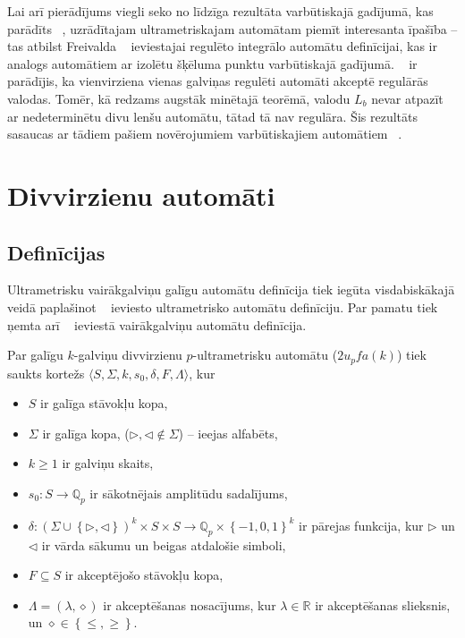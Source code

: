 \documentclass{ludis}
\begin{document}

Lai arī pierādījums viegli seko no līdzīga rezultāta varbūtiskajā gadījumā, kas parādīts ~\citep{Freivalds1979}, uzrādītajam ultrametriskajam automātam piemīt interesanta īpašība -- tas atbilst Freivalda ~\citep{Freivalds2012} ieviestajai regulēto integrālo automātu definīcijai, kas ir analogs automātiem ar izolētu šķēluma punktu varbūtiskajā gadījumā. ~\citet{KasparsBalodis2013} ir parādījis, ka vienvirziena vienas galviņas regulēti automāti akceptē regulārās valodas. Tomēr, kā redzams augstāk minētajā teorēmā, valodu $L_b$ nevar atpazīt ar nedeterminētu divu lenšu automātu, tātad tā nav regulāra. Šis rezultāts sasaucas ar tādiem pašiem novērojumiem varbūtiskajiem automātiem ~\citep{Freivalds1981,Freivalds1979}.

\chapter{Divvirzienu automāti}
\section{Definīcijas}
Ultrametrisku vairākgalviņu galīgu automātu definīcija tiek iegūta visdabiskākajā veidā paplašinot ~\citep{KasparsBalodis2013} ieviesto ultrametrisko automātu definīciju. Par pamatu tiek ņemta arī ~\citep{Holzer2009} ieviestā vairākgalviņu automātu definīcija.

\begin{definicija}
Par galīgu $k$-galviņu divvirzienu $p$-ultrametrisku automātu ($2u_pfa(k)$) tiek saukts kortežs $\langle S, \Sigma, k, s_0, \delta, F, \Lambda \rangle$, kur
\begin{itemize}
	\item $S$ ir galīga stāvokļu kopa,
	\item $\Sigma$ ir galīga kopa, ($ \triangleright,\triangleleft \notin \Sigma$) -- ieejas alfabēts,
	\item $k\geq 1$ ir galviņu skaits, 
	\item $s_0:S \rightarrow \mathbb{Q}_p$ ir sākotnējais amplitūdu sadalījums,
	\item $\delta: \left( \Sigma \cup \left\{ \triangleright, \triangleleft \right\} \right)^k \times S \times S \rightarrow \mathbb{Q}_p \times \left\{-1,0,1\right\}^k$ ir pārejas funkcija, kur $\triangleright$ un $\triangleleft$ ir vārda sākumu un beigas atdalošie simboli,
	\item $F \subseteq S$ ir akceptējošo stāvokļu kopa,
	\item $\Lambda = \left( \lambda, \diamond \right)$ ir akceptēšanas nosacījums, kur $\lambda \in \mathbb{R}$ ir akceptēšanas slieksnis, un $\diamond \in \left\{ \leq, \geq \right\}$.
\end{itemize}
\end{definicija}
\end{document}
